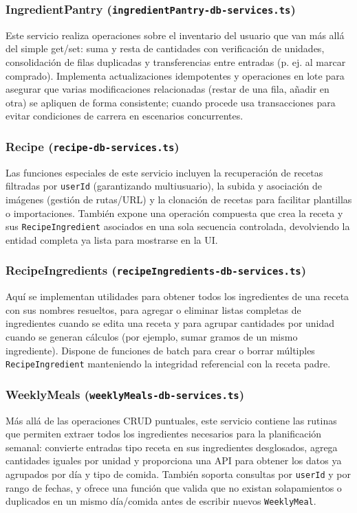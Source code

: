 \documentclass[twoside, openright, 11pt]{report}
\begin{document}
				
				\subsubsection{IngredientPantry (\texttt{ingredientPantry-db-services.ts})}
				Este servicio realiza operaciones sobre el inventario del usuario que van más allá del simple get/set: suma y resta de cantidades con verificación de unidades, consolidación de filas duplicadas y transferencias entre entradas (p. ej. al marcar comprado). Implementa actualizaciones idempotentes y operaciones en lote para asegurar que varias modificaciones relacionadas (restar de una fila, añadir en otra) se apliquen de forma consistente; cuando procede usa transacciones para evitar condiciones de carrera en escenarios concurrentes.
				
				\subsubsection{Recipe (\texttt{recipe-db-services.ts})}
				Las funciones especiales de este servicio incluyen la recuperación de recetas filtradas por \texttt{userId} (garantizando multiusuario), la subida y asociación de imágenes (gestión de rutas/URL) y la clonación de recetas para facilitar plantillas o importaciones. También expone una operación compuesta que crea la receta y sus \texttt{RecipeIngredient} asociados en una sola secuencia controlada, devolviendo la entidad completa ya lista para mostrarse en la UI.
				
				\subsubsection{RecipeIngredients (\texttt{recipeIngredients-db-services.ts})}
				Aquí se implementan utilidades para obtener todos los ingredientes de una receta con sus nombres resueltos, para agregar o eliminar listas completas de ingredientes cuando se edita una receta y para agrupar cantidades por unidad cuando se generan cálculos (por ejemplo, sumar gramos de un mismo ingrediente). Dispone de funciones de batch para crear o borrar múltiples \texttt{RecipeIngredient} manteniendo la integridad referencial con la receta padre.
				
				\subsubsection{WeeklyMeals (\texttt{weeklyMeals-db-services.ts})}
				Más allá de las operaciones CRUD puntuales, este servicio contiene las rutinas que permiten extraer todos los ingredientes necesarios para la planificación semanal: convierte entradas tipo receta en sus ingredientes desglosados, agrega cantidades iguales por unidad y proporciona una API para obtener los datos ya agrupados por día y tipo de comida. También soporta consultas por \texttt{userId} y por rango de fechas, y ofrece una función que valida que no existan solapamientos o duplicados en un mismo día/comida antes de escribir nuevos \texttt{WeeklyMeal}.
				
\end{document}
